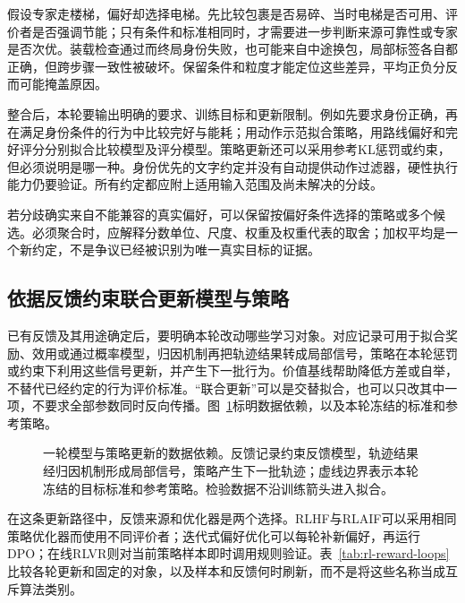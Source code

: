 假设专家走楼梯，偏好却选择电梯。先比较包裹是否易碎、当时电梯是否可用、评价者是否强调节能；只有条件和标准相同时，才需要进一步判断来源可靠性或专家是否次优。装载检查通过而终局身份失败，也可能来自中途换包，局部标签各自都正确，但跨步骤一致性被破坏。保留条件和粒度才能定位这些差异，平均正负分反而可能掩盖原因。

整合后，本轮要输出明确的要求、训练目标和更新限制。例如先要求身份正确，再在满足身份条件的行为中比较完好与能耗；用动作示范拟合策略，用路线偏好和完好评分分别拟合比较模型及评分模型。策略更新还可以采用参考KL惩罚或约束，但必须说明是哪一种。身份优先的文字约定并没有自动提供动作过滤器，硬性执行能力仍要验证。所有约定都应附上适用输入范围及尚未解决的分歧。

若分歧确实来自不能兼容的真实偏好，可以保留按偏好条件选择的策略或多个候选。必须聚合时，应解释分数单位、尺度、权重及权重代表的取舍；加权平均是一个新约定，不是争议已经被识别为唯一真实目标的证据。

\subsection{依据反馈约束联合更新模型与策略}
\label{sec:rl-reward-joint-update}

已有反馈及其用途确定后，要明确本轮改动哪些学习对象。对应记录可用于拟合奖励、效用或通过概率模型，归因机制再把轨迹结果转成局部信号，策略在本轮惩罚或约束下利用这些信号更新，并产生下一批行为。价值基线帮助降低方差或自举，不替代已经约定的行为评价标准。“联合更新”可以是交替拟合，也可以只改其中一项，不要求全部参数同时反向传播。图~\ref{fig:rl-reward-update}标明数据依赖，以及本轮冻结的标准和参考策略。

\begin{figure}[htbp]
  \centering
  
  \caption{一轮模型与策略更新的数据依赖。反馈记录约束反馈模型，轨迹结果经归因机制形成局部信号，策略产生下一批轨迹；虚线边界表示本轮冻结的目标标准和参考策略。检验数据不沿训练箭头进入拟合。}
  \label{fig:rl-reward-update}
\end{figure}

在这条更新路径中，反馈来源和优化器是两个选择。RLHF与RLAIF可以采用相同策略优化器而使用不同评价者；迭代式偏好优化可以每轮补新偏好，再运行DPO；在线RLVR则对当前策略样本即时调用规则验证。表~\ref{tab:rl-reward-loops}比较各轮更新和固定的对象，以及样本和反馈何时刷新，而不是将这些名称当成互斥算法类别。

